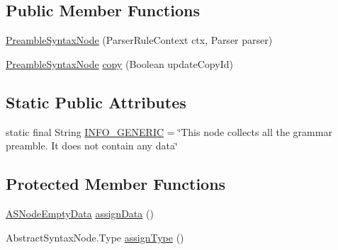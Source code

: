 \subsection*{Public Member Functions}
\begin{DoxyCompactItemize}
\item 
\hyperlink{classit_1_1emarolab_1_1cagg_1_1core_1_1language_1_1syntax_1_1abstractTree_1_1syntaxNodeType_1_1PreambleSyntaxNode_ac5acfdbf154eab4b586ea3105a8b941b}{Preamble\-Syntax\-Node} (Parser\-Rule\-Context ctx, Parser parser)
\item 
\hyperlink{classit_1_1emarolab_1_1cagg_1_1core_1_1language_1_1syntax_1_1abstractTree_1_1syntaxNodeType_1_1PreambleSyntaxNode}{Preamble\-Syntax\-Node} \hyperlink{classit_1_1emarolab_1_1cagg_1_1core_1_1language_1_1syntax_1_1abstractTree_1_1syntaxNodeType_1_1PreambleSyntaxNode_acfa5b023ca7e4aa23ab4c8240b87f9c3}{copy} (Boolean update\-Copy\-Id)
\end{DoxyCompactItemize}
\subsection*{Static Public Attributes}
\begin{DoxyCompactItemize}
\item 
static final String \hyperlink{classit_1_1emarolab_1_1cagg_1_1core_1_1language_1_1syntax_1_1abstractTree_1_1syntaxNodeType_1_1PreambleSyntaxNode_a7bac726c75d622cc23a1dee611691a4d}{I\-N\-F\-O\-\_\-\-G\-E\-N\-E\-R\-I\-C} = \char`\"{}This node collects all the grammar preamble. It does not contain any data\char`\"{}
\end{DoxyCompactItemize}
\subsection*{Protected Member Functions}
\begin{DoxyCompactItemize}
\item 
\hyperlink{classit_1_1emarolab_1_1cagg_1_1core_1_1language_1_1syntax_1_1abstractTree_1_1AbstractDataFactory_1_1ASNodeEmptyData}{A\-S\-Node\-Empty\-Data} \hyperlink{classit_1_1emarolab_1_1cagg_1_1core_1_1language_1_1syntax_1_1abstractTree_1_1syntaxNodeType_1_1PreambleSyntaxNode_a9ee52a341fd023b1a631c7e7cc7577b0}{assign\-Data} ()
\item 
Abstract\-Syntax\-Node.\-Type \hyperlink{classit_1_1emarolab_1_1cagg_1_1core_1_1language_1_1syntax_1_1abstractTree_1_1syntaxNodeType_1_1PreambleSyntaxNode_a92e23f4972e18da94d7a622e5e749e37}{assign\-Type} ()
\end{DoxyCompactItemize}


